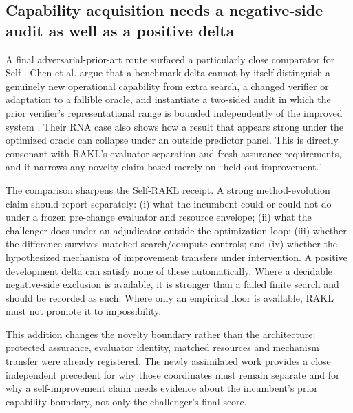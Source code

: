 \subsection{Capability acquisition needs a negative-side audit as well as a positive delta}

A final adversarial-prior-art route surfaced a particularly close comparator for Self-\RAKL{}. Chen et al. argue that a benchmark delta cannot by itself distinguish a genuinely new operational capability from extra search, a changed verifier or adaptation to a fallible oracle, and instantiate a two-sided audit in which the prior verifier's representational range is bounded independently of the improved system \cite{chen2026twosided}. Their RNA case also shows how a result that appears strong under the optimized oracle can collapse under an outside predictor panel. This is directly consonant with RAKL's evaluator-separation and fresh-assurance requirements, and it narrows any novelty claim based merely on ``held-out improvement.''

The comparison sharpens the Self-RAKL receipt. A strong method-evolution claim should report separately: (i) what the incumbent could or could not do under a frozen pre-change evaluator and resource envelope; (ii) what the challenger does under an adjudicator outside the optimization loop; (iii) whether the difference survives matched-search/compute controls; and (iv) whether the hypothesized mechanism of improvement transfers under intervention. A positive development delta can satisfy none of these automatically. Where a decidable negative-side exclusion is available, it is stronger than a failed finite search and should be recorded as such. Where only an empirical floor is available, RAKL must not promote it to impossibility.

This addition changes the novelty boundary rather than the architecture: protected assurance, evaluator identity, matched resources and mechanism transfer were already registered. The newly assimilated work provides a close independent precedent for why those coordinates must remain separate and for why a self-improvement claim needs evidence about the incumbent's prior capability boundary, not only the challenger's final score.
